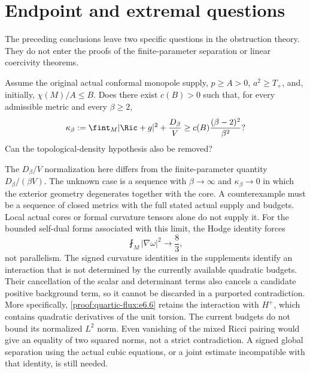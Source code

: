 \section{Endpoint and extremal questions}
\label{sec:open-problems}
The preceding conclusions leave two specific questions in the obstruction
theory. They do not enter the proofs of the finite-parameter separation or
linear coercivity theorems.

\begin{problem}
Assume the original actual conformal monopole supply, $p\ge A>0$,
$a^2\ge T_+$, and, initially, $\chi(M)/A\le B$. Does there exist
$c(B)>0$ such that, for every admissible metric and every $\beta\ge2$,
\[
 \kappa_\beta:=\fint_M|\Ric+g|^2+\frac{D_\beta}{V}
 \ge c(B)\frac{(\beta-2)^2}{\beta^2}?
\]
Can the topological-density hypothesis also be removed?
\end{problem}
The $D_\beta/V$ normalization here differs from the finite-parameter
quantity $D_\beta/(\beta V)$. The unknown case is a sequence with
$\beta\to\infty$ and $\kappa_\beta\to0$ in which the exterior geometry
degenerates together with the core. A counterexample must be a sequence
of closed metrics with the full stated actual supply and budgets.
Local actual cores or formal curvature tensors alone do not supply it.
For the bounded self-dual forms associated with this limit, the Hodge
identity forces
\[
 \fint_M|\nabla\omega|^2\longrightarrow\frac83,
\]
not parallelism. The signed curvature identities in the supplements
identify an interaction that is not determined by the currently available
quadratic budgets. Their cancellation of the scalar and determinant
terms also cancels a candidate positive background term, so it cannot
be discarded in a purported contradiction. More specifically,
\eqref{proof:quartic-flux:e6.6} retains the interaction with $H^+$,
which contains quadratic derivatives of the unit torsion. The current
budgets do not bound its normalized $L^2$ norm. Even vanishing of the
mixed Ricci pairing would give an equality of two squared norms, not a
strict contradiction. A signed global separation using the actual cubic
equations, or a joint estimate incompatible with that identity, is still
needed.

